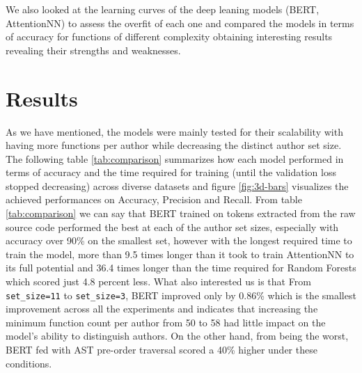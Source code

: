\documentclass{article}
\begin{document}
We also looked at the learning curves of the deep leaning models (BERT, AttentionNN) to assess the overfit of each one and compared the models in terms of 
accuracy for functions of different complexity obtaining interesting results revealing their strengths and weaknesses.


\section{Results}

As we have mentioned, the models were mainly tested for their scalability with having more functions per author while decreasing the distinct author set size.
The following table \ref{tab:comparison} summarizes how each model performed in terms of accuracy and the time required for training (until the validation loss stopped decreasing) across diverse datasets
and figure \ref{fig:3d-bars} visualizes the achieved performances on Accuracy, Precision and Recall. From table \ref{tab:comparison} we can say that BERT 
trained on tokens extracted from the raw source code performed the best at each of the author set sizes, especially with accuracy over 90\% on the smallest set, however with the longest required time to train the model, more than 
9.5 times longer than it took to train AttentionNN to its full potential and 36.4 times longer than the time required for Random Forests which scored just 4.8 percent less.
What also interested us is that From \texttt{set\_size=11} to \texttt{set\_size=3}, BERT improved only by 0.86\% which is the smallest improvement across all the experiments and indicates that increasing the minimum function 
count per author from 50 to 58 had little impact on the model's ability to distinguish authors. 
On the other hand, from being the worst, BERT fed with AST pre-order traversal scored a 40\% higher under these conditions. 
\end{document}
